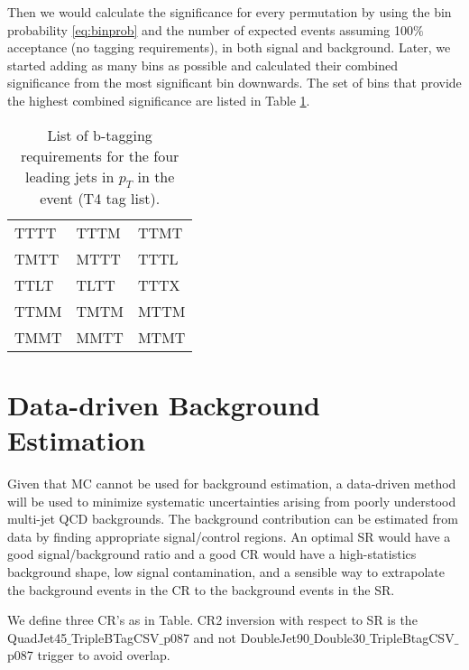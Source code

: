 Then we would calculate the significance for every permutation by using the bin probability \ref{eq:binprob} and the number of expected events assuming 100$\%$ acceptance (no tagging requirements), in both signal and background. Later, we started adding as many bins as possible and calculated their combined significance from the most significant bin downwards. The set of bins that provide the highest combined significance are listed in Table \ref{tab:t4tag}.

\begin{table}[hbtp]\footnotesize
	\centering
	\begin{tabular}{l|l|l}
		\hline
		TTTT & TTTM & TTMT\\
		TMTT & MTTT & TTTL\\
		TTLT & TLTT & TTTX\\
		TTMM & TMTM & MTTM\\
		TMMT & MMTT & MTMT\\
		\hline
	\end{tabular}
	\caption{List of b-tagging requirements for the four leading jets in $p_{T}$ in the event (T4 tag list).}
	\label{tab:t4tag}
\end{table}


\section{Data-driven Background Estimation\label{sec:datadriven}}
Given that MC cannot be used for background estimation, a data-driven method will be used to minimize systematic uncertainties arising from poorly understood multi-jet QCD backgrounds. The background contribution can be estimated from data by finding appropriate signal/control regions. An optimal SR would have a good signal/background ratio and a good CR would have a high-statistics background shape, low signal contamination, and a sensible way to extrapolate the background events in the CR to the background events in the SR.

We define three CR's as in Table. CR2 inversion with respect to SR is the QuadJet45$\_$TripleBTagCSV$\_$p087 and not DoubleJet90$\_$Double30$\_$TripleBtagCSV$\_$p087 trigger to avoid overlap.


